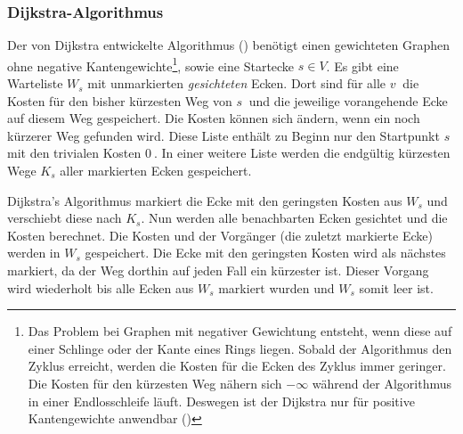 \subsubsection{Dijkstra-Algorithmus}
\label{sec:dijkstra}
Der von Dijkstra entwickelte Algorithmus (\cite{dijkstra}) benötigt einen gewichteten Graphen ohne negative Kantengewichte\footnote{Das Problem bei Graphen mit negativer Gewichtung entsteht, wenn diese auf einer Schlinge oder der Kante eines Rings liegen.
Sobald der Algorithmus den Zyklus erreicht, werden die Kosten für die Ecken des Zyklus immer geringer.
Die Kosten für den kürzesten Weg nähern sich $-\infty $ während der Algorithmus in einer Endlosschleife läuft.
Deswegen ist der Dijkstra nur für positive Kantengewichte anwendbar (\cite[194\psq]{kurt})}, sowie eine Startecke $s \in V$.
Es gibt eine Warteliste $W_{s}$ mit unmarkierten \textit{gesichteten} Ecken.
Dort sind für alle $v~$ die Kosten für den bisher kürzesten Weg von $s~$ und die jeweilige vorangehende Ecke auf diesem Weg gespeichert.
Die Kosten können sich ändern, wenn ein noch kürzerer Weg gefunden wird.
Diese Liste enthält zu Beginn nur den Startpunkt $s~$ mit den trivialen Kosten $0~$.
In einer weitere Liste werden die endgültig kürzesten Wege $K_{s}$ aller markierten Ecken gespeichert.

Dijkstra's Algorithmus markiert die Ecke mit den geringsten Kosten aus $W_{s}$ und verschiebt diese nach $K_{s}$.
Nun werden alle benachbarten Ecken gesichtet und die Kosten berechnet.
Die Kosten und der Vorgänger (die zuletzt markierte Ecke) werden in $W_{s}$ gespeichert.
Die Ecke mit den geringsten Kosten wird als nächstes markiert, da der Weg dorthin auf jeden Fall ein kürzester ist.
Dieser Vorgang wird wiederholt bis alle Ecken aus $W_{s}$ markiert wurden und $W_{s}$ somit leer ist.


